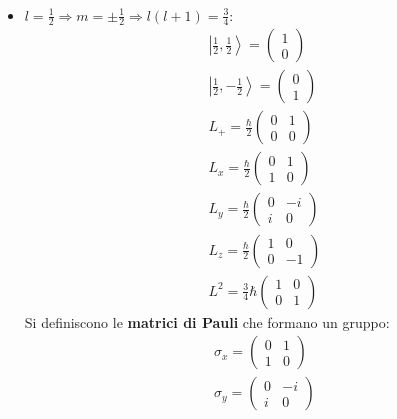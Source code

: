 \begin{itemize}
\begin{equation}
\begin{split}
\end{split}\end{equation}
\item $l=\frac{1}{2} \Longrightarrow m=\pm\frac{1}{2} \Longrightarrow l\left(l+1\right)=\frac{3}{4}$:
\begin{equation}\begin{split}
\left |\frac{1}{2},\frac{1}{2} \right\rangle=\left(\begin{matrix}1\\0\end{matrix}\right) \\
\left |\frac{1}{2}, -\frac{1}{2} \right\rangle=\left(\begin{matrix}0\\1\end{matrix}\right) \\
L_+=\frac{\hbar}{2}\left(\begin{matrix}0&1\\0&0\end{matrix}\right) \\
L_x=\frac{\hbar }{2}\left(\begin{matrix}0&1\\1&0\end{matrix}\right) \\
L_y=\frac{\hbar }{2}\left(\begin{matrix}0&-i\\i&0\end{matrix}\right) \\
L_z=\frac{\hbar }{2}\left(\begin{matrix}1&0\\0&-1\end{matrix}\right) \\
L^2=\frac{3}{4}\hbar\left(\begin{matrix}1&0\\0&1\end{matrix}\right)
\end{split}\end{equation}
Si definiscono le \textbf{matrici di Pauli} che formano un gruppo:
\begin{equation}\begin{split}
\sigma_x=\left(\begin{matrix}0&1\\1&0\end{matrix}\right) \\
\sigma_y=\left(\begin{matrix}0&-i\\i&0\end{matrix}\right) \\

\end{split}
\end{equation}
\end{itemize}
